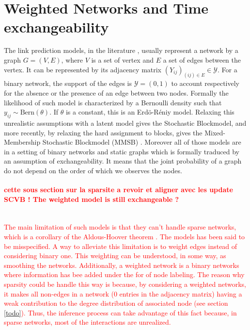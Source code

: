 
\section{Weighted Networks and Time exchangeability}

The link prediction models, in the literature \cite{goldenberg2010survey,lu2011link}, usually represent a network by a graph $G=(V,E)$, where $V$ is a set of vertex and $E$ a set of edges between the vertex. It can be represented by its adjacency matrix $(Y_{ij})_{(ij) \in E} \in \mathcal{Y}$. For a binary network, the support of the edges is $\mathcal{Y} = (0,1)$ to account respectively for the absence or the presence of an edge between two nodes. Formally the likelihood of such model is characterized by a Bernoulli density such that $y_{ij} \sim \mathrm{Bern}(\theta)$. If $\theta$ is a constant, this is an Erd\"o-R\'eniy model. Relaxing this unrealistic assumptions with a latent model gives the Stochastic Blockmodel, and more recently, by relaxing the hard assignment to blocks, gives the Mixed-Membership Stochastic Blockmodel (MMSB) \cite{MMSB}. Moreover all of those models are in a setting of binary networks and  static graphs which is formally traduced by an assumption of exchangeability. It means that the joint probability of a graph do not depend on the order of which we observes the nodes. %

\textcolor{red}{\paragraph{cette sous section sur la sparsite a revoir et aligner avec les update SCVB ! The weighted model is still exchangeable ?}~\\
The main limitation of such models is that they can't handle sparse networks, which is a corollary of the Aldous-Hoover theorem \cite{orbanz2015bayesian}. The models has been said to be misspecified. A way to alleviate this limitation is to weight edges instead of considering binary one. This weighting can be understood, in some way, as smoothing the networks. Additionally, a weighted network is a binary networks where information has bee added under the for of node labeling. The reason why sparsity could be handle this way is because, by considering a weighted networks, it makes all non-edges in a network (0 entries in the adjacency matrix) having a weak contribution to the degree distribution of associated node (see section \ref{todo}). Thus, the inference process can take advantage of this fact because, in sparse networks, most of the interactions are unrealized.}

